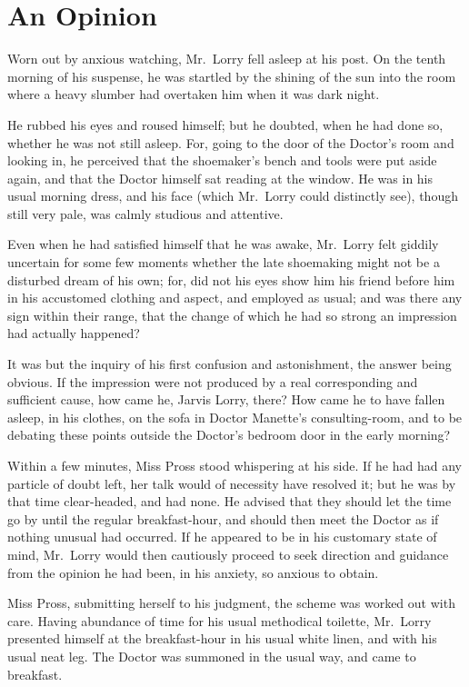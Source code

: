 \chapter{An Opinion}


Worn out by anxious watching, Mr.\ Lorry fell asleep at his post.  On
the tenth morning of his suspense, he was startled by the shining of
the sun into the room where a heavy slumber had overtaken him when it
was dark night.

He rubbed his eyes and roused himself; but he doubted, when he had
done so, whether he was not still asleep.  For, going to the door of
the Doctor's room and looking in, he perceived that the shoemaker's
bench and tools were put aside again, and that the Doctor himself sat
reading at the window.  He was in his usual morning dress, and his face
(which Mr.\ Lorry could distinctly see), though still very pale, was
calmly studious and attentive.

Even when he had satisfied himself that he was awake, Mr.\ Lorry felt
giddily uncertain for some few moments whether the late shoemaking
might not be a disturbed dream of his own; for, did not his eyes show
him his friend before him in his accustomed clothing and aspect, and
employed as usual; and was there any sign within their range, that the
change of which he had so strong an impression had actually happened?

It was but the inquiry of his first confusion and astonishment, the
answer being obvious.  If the impression were not produced by a real
corresponding and sufficient cause, how came he, Jarvis Lorry, there?
How came he to have fallen asleep, in his clothes, on the sofa in
Doctor Manette's consulting-room, and to be debating these points
outside the Doctor's bedroom door in the early morning?

Within a few minutes, Miss Pross stood whispering at his side.  If he
had had any particle of doubt left, her talk would of necessity have
resolved it; but he was by that time clear-headed, and had none.  He
advised that they should let the time go by until the regular
breakfast-hour, and should then meet the Doctor as if nothing unusual
had occurred.  If he appeared to be in his customary state of mind,
Mr.\ Lorry would then cautiously proceed to seek direction and guidance
from the opinion he had been, in his anxiety, so anxious to obtain.

Miss Pross, submitting herself to his judgment, the scheme was worked
out with care.  Having abundance of time for his usual methodical
toilette, Mr.\ Lorry presented himself at the breakfast-hour in his
usual white linen, and with his usual neat leg.  The Doctor was
summoned in the usual way, and came to breakfast.

